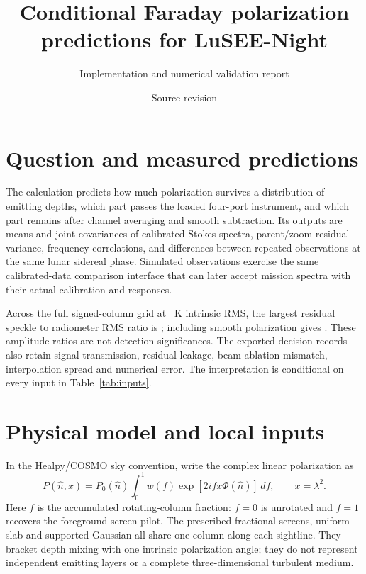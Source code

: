 \documentclass[10pt,letterpaper]{article}
\title{Conditional Faraday polarization predictions for LuSEE-Night}
\author{Implementation and numerical validation report}
\date{Source revision \texttt{\PaperSourceRevision}}
\begin{document}
\maketitle

\noindent{}

\section{Question and measured predictions}

The calculation predicts how much polarization survives a distribution of
emitting depths, which part passes the loaded four-port instrument, and
which part remains after channel averaging and smooth subtraction.
Its outputs are means and joint covariances of calibrated Stokes spectra,
parent/zoom residual variance, frequency correlations, and differences
between repeated observations at the same lunar sidereal phase. Simulated
observations exercise the same calibrated-data comparison interface that
can later accept mission spectra with their actual calibration and responses.

Across the full signed-column grid at \PhysicalRms\ K intrinsic RMS,
the largest residual speckle to radiometer RMS ratio is \MaxSpeckleNoise;
including smooth polarization gives \MaxTotalNoise. These amplitude ratios
are not detection significances. The exported decision records also retain
signal transmission, residual leakage, beam ablation mismatch, interpolation
spread and numerical error. The interpretation is conditional on every
input in Table~\ref{tab:inputs}.

\section{Physical model and local inputs}

In the Healpy/COSMO sky convention, write the complex linear polarization as
\begin{equation}
 P(\hat n,x)=P_0(\hat n)\int_0^1 w(f)
       \exp[2ifx\Phi(\hat n)]\,df,\qquad x=\lambda^2.
\end{equation}
Here $f$ is the accumulated rotating-column fraction: $f=0$ is unrotated
and $f=1$ recovers the foreground-screen pilot. The prescribed fractional
screens, uniform slab and supported Gaussian all share one column along
each sightline. They bracket depth mixing with one intrinsic polarization
angle; they do not represent independent emitting layers or a complete
three-dimensional turbulent medium.
\end{document}
